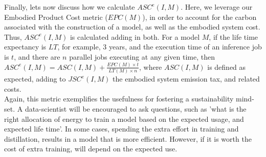 Finally, lets now discuss how we calculate $ASC^e(I,M)$. Here, we leverage our Embodied Product Cost metric ($EPC(M)$), in order 
to account for the carbon associated with  the construction of a model, as well as the embodied system cost. 
Thus, $ASC^e(I,M)$ is calculated adding in both. For a model $M$, if the life time expectancy is $LT$, for example, $3$ years, and the execution time of an inference job is $t$, and there are $n$ parallel jobs executing at any given time, then $ASC^e(I,M) = ASC(I,M) + \frac{EPC(M) \times t}{LT(M)\times n}$, where $ASC(I,M)$ is defined as expected, adding to $JSC^e(I,M)$ the 
embodied system emission tax, and related costs. 
\\
Again, this metric exemplifies the usefulness for fostering a sustainability mind-set. A data-scientist will be encouraged to 
ask questions, such as 'what is the right allocation of energy to train a model based on the expected usage, and expected life time'. In some cases, 
spending the extra effort in training and distillation, results in a model that is more efficient. However, if it is worth the cost of extra training, will depend on the expected use.




